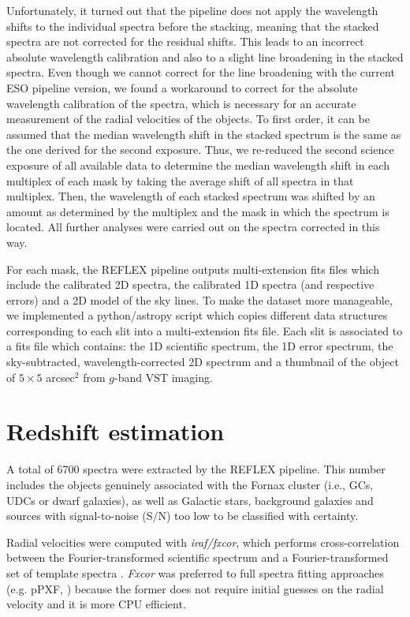 \documentclass[useAMS,usenatbib]{mn2e}
\begin{document}
Unfortunately, it turned out that the pipeline does not apply the wavelength 
shifts to the individual spectra before the stacking, meaning that the stacked
spectra are not corrected for the residual shifts. This leads to an incorrect
absolute wavelength calibration and also to a slight line broadening in the 
stacked spectra. Even though we cannot correct for the line broadening with
the current ESO pipeline version, we found a workaround to correct for the
absolute wavelength calibration of the spectra, which is necessary for an 
accurate measurement of the radial velocities of the objects. To first order, 
it can be assumed that the median wavelength shift in the stacked spectrum is 
the same as the one derived for the second exposure. Thus, we re-reduced the 
second science exposure of all available data to determine the median 
wavelength shift in each multiplex of each mask by taking the average shift 
of all spectra in that multiplex. Then, the wavelength of each stacked 
spectrum was shifted by an amount as determined by the multiplex and the mask
in which the spectrum is located. All further analyses were carried out 
on the spectra corrected in this way.

For each mask, the REFLEX pipeline outputs multi-extension fits files which include the calibrated 2D spectra, the calibrated 1D spectra (and respective errors) and a 2D model of the sky lines. To make the dataset more manageable, we implemented a python/astropy script which copies different data structures corresponding to each slit into a multi-extension fits file. Each slit is associated to a fits file which contains: the 1D scientific spectrum, the 1D error spectrum, the sky-subtracted, wavelength-corrected 2D spectrum and a thumbnail of the object of $5\times5$ arcsec$^2$ from $g$-band VST imaging. 

\section{Redshift estimation}
\label{sec:zest}

A total of 6700 spectra were extracted by the REFLEX pipeline. This number includes the objects genuinely associated with the Fornax cluster (i.e., GCs, UDCs or dwarf galaxies), as well as Galactic stars, background galaxies and sources with signal-to-noise (S$/$N) too low to be classified with certainty. 

Radial velocities were computed with {\it iraf/fxcor}, which performs cross-correlation between the Fourier-transformed scientific spectrum and a Fourier-transformed set of template spectra \citep{Tonry79}. {\it Fxcor} was preferred to full spectra fitting approaches (e.g. pPXF, \citealt{Cappellari04}) because the former does not require initial guesses on the radial velocity and it is more CPU efficient. 
\end{document}
